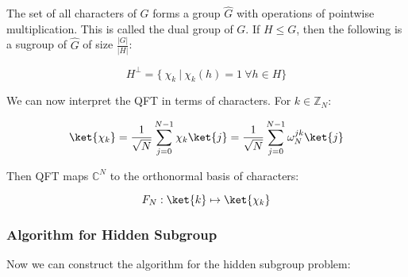 The set of all characters of $G$ forms a group $\hat{G}$ with operations of pointwise multiplication. This is called the dual group of $G$. If $H \leq G$, then the following is a sugroup of $\hat{G}$ of size $\frac{|G|}{|H|}$:

\begin{equation*}
    H^\perp = \{ \ \chi_k \ | \ \chi_k(h) = 1 \ \forall h \in H \}
\end{equation*}

We can now interpret the QFT in terms of characters. For $k \in \mathbb{Z}_N$:

\begin{equation*}
    \ket{\chi_k} = \frac{1}{\sqrt{N}} \sum_{j=0}^{N-1} \chi_k \ket{j} = \frac{1}{\sqrt{N}} \sum_{j=0}^{N-1} \omega^{jk}_N \ket{j}
\end{equation*}

Then QFT maps $\mathbb{C}^N$ to the orthonormal basis of characters:

\begin{equation*}
    F_N : \ket{k} \mapsto \ket{\chi_k}
\end{equation*}

\subsubsection{Algorithm for Hidden Subgroup}
\label{Subsub: Algorithm hidden subgroup}
Now we can construct the algorithm for the hidden subgroup problem:

